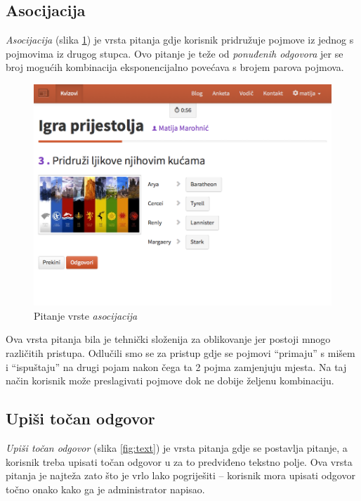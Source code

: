 \documentclass[11pt]{scrreprt}
\begin{document}
\subsection{Asocijacija}

\emph{Asocijacija} (slika \ref{fig:association}) je vrsta pitanja gdje korisnik
pridružuje pojmove iz jednog s pojmovima iz drugog stupca. Ovo pitanje je teže
od \emph{ponuđenih odgovora} jer se broj mogućih kombinacija eksponencijalno
povećava s brojem parova pojmova.

\begin{figure}[H]
  \includegraphics[width=\textwidth, clip=true, trim=0 3cm 0 0, fbox]{student/association_question}
  \caption{Pitanje vrste \emph{asocijacija}}
  \label{fig:association}
\end{figure}

Ova vrsta pitanja bila je tehnički složenija za oblikovanje jer postoji mnogo
različitih pristupa. Odlučili smo se za pristup gdje se pojmovi ``primaju'' s
mišem i ``ispuštaju'' na drugi pojam nakon čega ta 2 pojma zamjenjuju mjesta.
Na taj način korisnik može preslagivati pojmove dok ne dobije željenu
kombinaciju.

\subsection{Upiši točan odgovor}

\emph{Upiši točan odgovor} (slika \ref{fig:text}) je vrsta pitanja gdje se
postavlja pitanje, a korisnik treba upisati točan odgovor u za to predviđeno
tekstno polje. Ova vrsta pitanja je najteža zato što je vrlo lako pogriješiti
-- korisnik mora upisati odgovor točno onako kako ga je administrator napisao.
\end{document}
